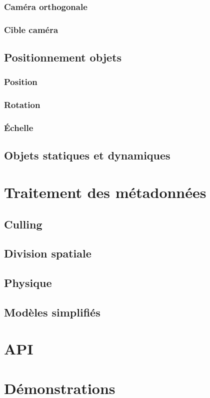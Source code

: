 \documentclass [a4 paper,11pt]{article}
\begin{document}
\subsubsection*{Caméra orthogonale}
\subsubsection*{Cible caméra}

\subsection{Positionnement objets}

\subsubsection*{Position}
\subsubsection*{Rotation}
\subsubsection*{Échelle}

\subsection{Objets statiques et dynamiques}

\section{Traitement des métadonnées}

\subsection{Culling}
\subsection{Division spatiale}
\subsection{Physique}
\subsection{Modèles simplifiés}

\section{API}

\section{Démonstrations}
\end{document}
